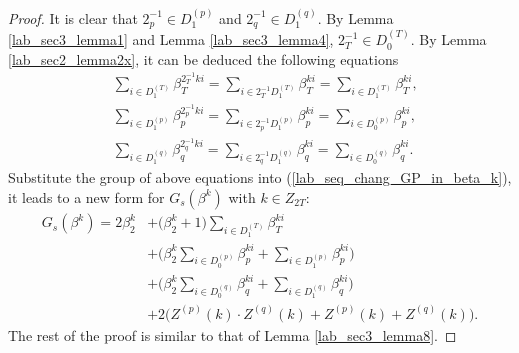 \documentclass{mcom-l}
\theoremstyle{definition}
\numberwithin{equation}{section}
\begin{document}
  \begin{proof}
  It is clear that $ 2_{p}^{-1}\in D_{1}^{(p)} $ and $ 2_{q}^{-1}\in D_{1}^{(q)} $. By Lemma \ref{lab_sec3_lemma1} and Lemma \ref{lab_sec3_lemma4}, $ 2_{T}^{-1}\in D_{0}^{(T)} $. By Lemma \ref{lab_sec2_lemma2x}, it can be deduced the following equations
  \begin{equation*}
  \begin{split}
  &\sum_{i\in D_{1}^{(T)}}\beta_{T}^{2_{T}^{-1}ki}=\sum_{i\in 2_{T}^{-1}D_{1}^{(T)}}\beta_{T}^{ki}=\sum_{i\in D_{1}^{(T)}}\beta_{T}^{ki},\\
  &\sum_{i\in D_{1}^{(p)}}\beta_{p}^{2_{p}^{-1}ki}=\sum_{i\in 2_{p}^{-1}D_{1}^{(p)}}\beta_{p}^{ki}=\sum_{i\in D_{0}^{(p)}}\beta_{p}^{ki},\\
  &\sum_{i\in D_{1}^{(q)}}\beta_{q}^{2_{q}^{-1}ki}=\sum_{i\in 2_{q}^{-1}D_{1}^{(q)}}\beta_{q}^{ki}=\sum_{i\in D_{0}^{(q)}}\beta_{q}^{ki}.
  \end{split}
  \end{equation*}
  Substitute the group of above equations into (\ref{lab_seq_chang_GP_in_beta_k}), it leads to a new form for $ G_{s}(\beta^{k}) $ with $ k\in Z_{2T} $:
  \begin{equation}\label{Lab_Lemma9_prof_Gsbetak}
  \begin{split}
  G_{s}(\beta^{k})=2\beta_{2}^{k}&+\biggl(\beta_{2}^{k}+1\biggr)\sum_{i\in D_{1}^{(T)}}\beta_{T}^{ki}\\
     &+\biggl(\beta_{2}^{k}\sum_{i\in D_{0}^{(p)}}\beta_{p}^{ki}+\sum_{i\in D_{1}^{(p)}}\beta_{p}^{ki}\biggr)\\
     &+\biggl(\beta_{2}^{k}\sum_{i\in D_{0}^{(q)}}\beta_{q}^{ki}+\sum_{i\in D_{1}^{(q)}}\beta_{q}^{ki}\biggr)\\
     &+2\biggl(Z^{(p)}(k)\cdot Z^{(q)}(k)+Z^{(p)}(k)+Z^{(q)}(k)\biggr).
  \end{split}
  \end{equation}
  The rest of the proof is similar to that of Lemma \ref{lab_sec3_lemma8}.
  \end{proof}  
  
\end{document}
